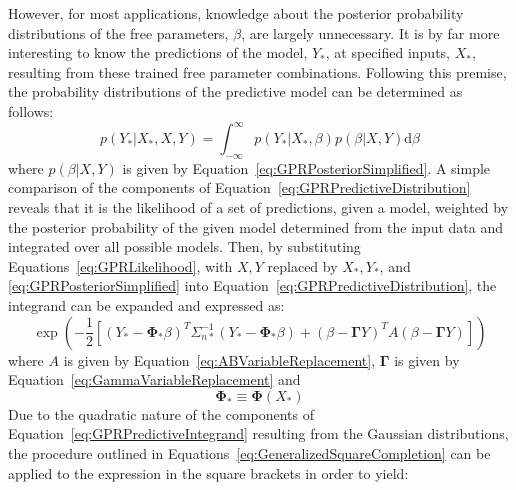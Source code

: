 \documentclass{article}
\begin{document}
However, for most applications, knowledge about the posterior probability distributions of the free parameters, $\beta$, are largely unnecessary. It is by far more interesting to know the predictions of the model, $Y_*$, at specified inputs, $X_*$, resulting from these trained free parameter combinations. Following this premise, the probability distributions of the predictive model can be determined as follows:
\begin{equation}
\label{eq:GPRPredictiveDistribution}
	p\!\left(Y_*|X_*,X,Y\right) = \int_{-\infty}^{\infty} p\!\left(Y_*|X_*,\beta\right) p\!\left(\beta|X,Y\right) \text{d}\beta
\end{equation}
where $p\!\left(\beta|X,Y\right)$ is given by Equation~\eqref{eq:GPRPosteriorSimplified}. A simple comparison of the components of Equation~\eqref{eq:GPRPredictiveDistribution} reveals that it is the likelihood of a set of predictions, given a model, weighted by the posterior probability of the given model determined from the input data and integrated over all possible models. Then, by substituting Equations~\eqref{eq:GPRLikelihood}, with $X,Y$ replaced by $X_*,Y_*$, and \eqref{eq:GPRPosteriorSimplified} into Equation~\eqref{eq:GPRPredictiveDistribution}, the integrand can be expanded and expressed as:
\begin{equation}
\label{eq:GPRPredictiveIntegrand}
	\exp\!\left(-\frac{1}{2} \left[\left(Y_* - \mathbf{\Phi}_* \beta\right)^T \Sigma_{n*}^{-1} \left(Y_* - \mathbf{\Phi}_* \beta\right) + \left(\beta - \mathbf{\Gamma} Y\right)^T A \left(\beta - \mathbf{\Gamma} Y\right)\right]\right)
\end{equation}
where $A$ is given by Equation~\eqref{eq:ABVariableReplacement}, $\mathbf{\Gamma}$ is given by Equation~\eqref{eq:GammaVariableReplacement} and 
\begin{equation}
\label{eq:ModelPredictionShorthand}
	\mathbf{\Phi}_* \equiv \mathbf{\Phi}\!\left(X_*\right)
\end{equation}
Due to the quadratic nature of the components of Equation~\eqref{eq:GPRPredictiveIntegrand} resulting from the Gaussian distributions, the procedure outlined in Equations~\eqref{eq:GeneralizedSquareCompletion} can be applied to the expression in the square brackets in order to yield:
\end{document}
